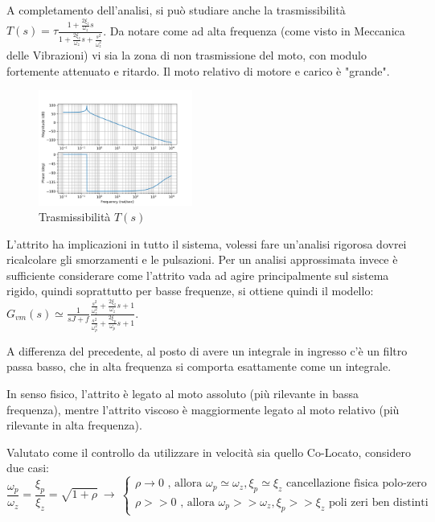 A completamento dell'analisi, si può studiare anche la trasmissibilità \(T(s) = \tau \frac{1+\frac{2\xi_z}{\omega_z}s}{1+\frac{2\xi_z}{\omega_z}s + \frac{s^2}{\omega_z^2}}\). Da notare come ad alta frequenza (come visto in Meccanica delle Vibrazioni) vi sia la zona di non trasmissione del moto, con modulo fortemente attenuato e ritardo. Il moto relativo di motore e carico è "grande".

\begin{figure}[h]
    \centering
    \includegraphics[width=0.45\textwidth]{Immagini/trasmissibilita.png}
    \caption{Trasmissibilità \(T(s)\)}
\end{figure}

L'attrito ha implicazioni in tutto il sistema, volessi fare un'analisi rigorosa dovrei ricalcolare gli smorzamenti e le pulsazioni. Per un analisi approssimata invece è sufficiente considerare come l'attrito vada ad agire principalmente sul sistema rigido, quindi soprattutto per basse frequenze, si ottiene quindi il modello: \(G_{vm}(s) \simeq \frac{1}{sJ+f} \frac{\frac{s^2}{\omega_z^2} + \frac{2\xi_z}{\omega_z} s + 1}{\frac{s^2}{\omega_p^2} + \frac{2\xi_p}{\omega_p} s + 1}\). 

A differenza del precedente, al posto di avere un integrale in ingresso c'è un filtro passa basso, che in alta frequenza si comporta esattamente come un integrale.

In senso fisico, l'attrito è legato al moto assoluto (più rilevante in bassa frequenza), mentre l'attrito viscoso è maggiormente legato al moto relativo (più rilevante in alta frequenza).

Valutato come il controllo da utilizzare in velocità sia quello Co-Locato, considero due casi:
\[
\frac{\omega_p}{\omega_z} = \frac{\xi_p}{\xi_z} = \sqrt{1+\rho} \ \rightarrow \
\begin{cases}
    \rho \rightarrow 0 \text{ , allora } \omega_p\simeq \omega_z, \xi_p\simeq \xi_z \text{ cancellazione fisica polo-zero} \\
    \rho >> 0 \text{ , allora } \omega_p >> \omega_z, \xi_p >> \xi_z \text{ poli zeri ben distinti}
\end{cases}
\]


